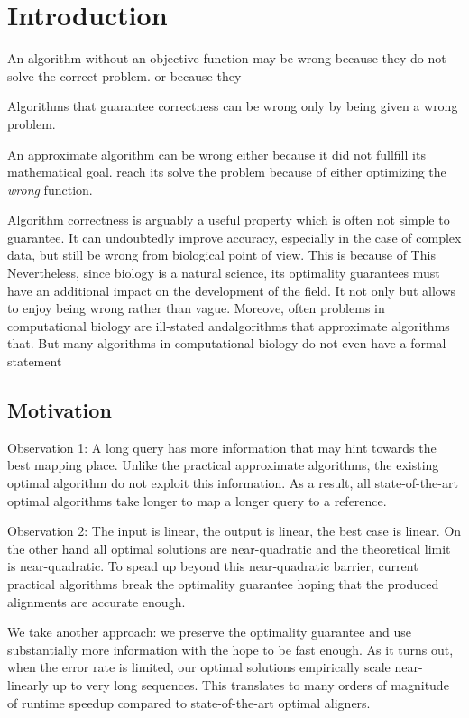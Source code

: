 \graphicspath{{\dir/}}

\chapter{Introduction} \label{ch:introduction}

An algorithm without an objective function may be wrong because they do not
solve the correct problem. or because they 

Algorithms that guarantee correctness can be wrong only by being given a wrong problem.

An approximate algorithm can be wrong either because it did not fullfill its
mathematical goal. reach its solve the problem because of either optimizing the
\emph{wrong} function.

Algorithm correctness is arguably a useful property which is often not simple to
guarantee. It can undoubtedly improve accuracy, especially in the case of
complex data, but still be wrong from biological point of view. This is because
of  This Nevertheless, since biology is a natural science, its  optimality
guarantees must have an additional impact on the development of the field. It
not only but allows to enjoy being wrong rather than vague. Moreove, often
problems in computational biology are ill-stated andalgorithms that approximate
algorithms that. But many algorithms in computational biology do not even have a
formal statement 

\section{Motivation}

Observation 1: A long query has more information that may hint towards the best
mapping place. Unlike the practical approximate algorithms, the existing optimal
algorithm do not exploit this information. As a result, all state-of-the-art
optimal algorithms take longer to map a longer query to a reference. 

Observation 2: The input is linear, the output is linear, the best case is
linear. On the other hand all optimal solutions are near-quadratic and the
theoretical limit is near-quadratic. To spead up beyond this near-quadratic
barrier, current practical algorithms break the optimality guarantee hoping that
the produced alignments are accurate enough. 

We take another approach: we preserve the optimality guarantee and use
substantially more information with the hope to be fast enough. As it turns out,
when the error rate is limited, our optimal solutions empirically scale
near-linearly up to very long sequences. This translates to many orders of
magnitude of runtime speedup compared to state-of-the-art optimal aligners.

